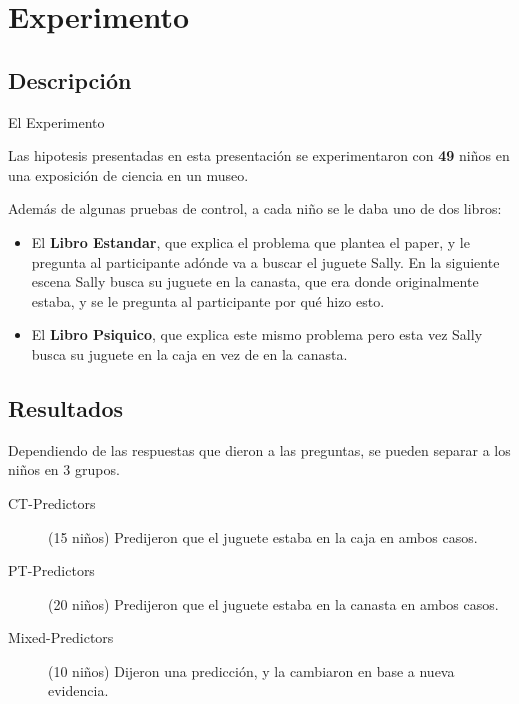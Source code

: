 \documentclass{beamer}
\begin{document}
\section{Experimento}
\subsection{Descripción}

\begin{frame}{El Experimento}

Las hipotesis presentadas en esta presentación se experimentaron con \textbf{49} niños en una exposición de ciencia en un museo.

Además de algunas pruebas de control, a cada niño se le daba uno de dos libros:

\begin{itemize}
\item El \textbf{Libro Estandar}, que explica el problema que plantea el paper, y le pregunta al participante adónde va a buscar el juguete Sally. En la siguiente escena Sally busca su juguete en la canasta, que era donde originalmente estaba, y se le pregunta al participante por qué hizo esto.
\item El \textbf{Libro Psiquico}, que explica este mismo problema pero esta vez Sally busca su juguete en la caja en vez de en la canasta.
\end{itemize}

\end{frame}

\subsection{Resultados}

\begin{frame}
Dependiendo de las respuestas que dieron a las preguntas, se pueden separar a los niños en 3 grupos.

\begin{description}
	\item[CT-Predictors] (15 niños) Predijeron que el juguete estaba en la caja en ambos casos.
	\item[PT-Predictors] (20 niños) Predijeron que el juguete estaba en la canasta en ambos casos.
	\item[Mixed-Predictors] (10 niños) Dijeron una predicción, y la cambiaron en base a nueva evidencia.
\end{description}
\end{frame}
\end{document}
